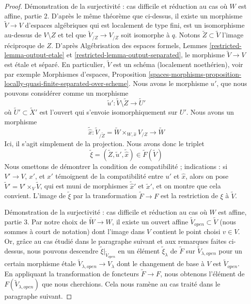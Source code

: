 \begin{proof}
\medskip\noindent
Démonstration de la surjectivité : cas difficile et réduction au cas où $W$ est affine, partie 2.
D'après le même théorème que ci-dessus, il existe un morphisme
$\tilde V \to V$ d'espaces algébriques qui est localement de type fini,
est un isomorphisme au-dessus de $V \setminus Z$ et tel que
$\tilde V_{/Z} \to V_{/Z}$ soit isomorphe à $q$.
Notons $\tilde Z \subset \tilde V$ l'image réciproque de $Z$.
D'après Algébrisation des espaces formels, Lemmes
\ref{restricted-lemma-output-etale} et \ref{restricted-lemma-output-separated},
le morphisme $\tilde V \to V$ est \'etale et séparé.
En particulier, $\tilde V$ est un schéma (localement noethérien), voir par exemple
Morphismes d'espaces, Proposition
\ref{spaces-morphisms-proposition-locally-quasi-finite-separated-over-scheme}.
Nous avons le morphisme $u'$, que nous pouvons considérer comme un morphisme
$$
\tilde u' : \tilde V \setminus \tilde Z \longrightarrow \tilde U'
$$
où $\tilde U' \subset \tilde X'$ est l'ouvert qui s'envoie isomorphiquement
sur $U'$. Nous avons un morphisme
$$
\tilde {\hat x} :
\tilde V_{/\tilde Z} = \tilde W \times_{W, \hat x} V_{/Z}
\longrightarrow
\tilde W
$$
Ici, il s'agit simplement de la projection. Nous avons donc le triplet
$$
\tilde \xi = (\tilde Z, \tilde u', \tilde {\hat x}) \in \tilde F(\tilde V)
$$
Nous omettons de démontrer la condition de compatibilité ; indications : si $V' \to V$, $\hat x'$,
et $x'$ témoignent de la compatibilité entre $u'$ et $\hat x$, alors on
pose $\tilde V' = V' \times_V \tilde V$, qui est muni de morphismes
$\tilde{\hat x}'$ et $\tilde x'$, et on montre que cela convient.
L'image de $\tilde \xi$ par la transformation $\tilde F \to F$
est la restriction de $\xi$ à $\tilde V$.

\medskip\noindent
Démonstration de la surjectivité : cas difficile et réduction au cas où $W$ est affine, partie 3.
Par notre choix de $\tilde W \to W$, il existe un ouvert affine
$\tilde V_{open} \subset \tilde V$ (nous sommes à court de notation)
dont l'image dans $V$ contient le point choisi $v \in V$.
Or, grâce au cas étudié dans le paragraphe suivant et aux remarques faites
ci-dessus, nous pouvons descendre $\tilde \xi|_{\tilde V_{open}}$
en un élément $\tilde \xi_\lambda$ de $\tilde F$ sur
$\tilde V_{\lambda, open}$
pour un certain morphisme \'etale $\tilde V_{\lambda, open} \to V_\lambda$
dont le changement de base à $V$ est $\tilde V_{open}$.
En appliquant la transformation de foncteurs $\tilde F \to F$,
nous obtenons l'élément de $F(\tilde V_{\lambda, open})$
que nous cherchions. Cela nous ramène au cas traité
dans le paragraphe suivant.


\end{proof}
